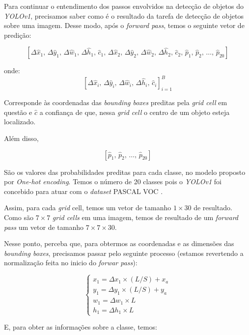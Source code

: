 Para continuar o entendimento dos passos envolvidos na detecção de objetos do \emph{YOLOv1}, precisamos saber como é o resultado da tarefa de detecção de objetos sobre uma imagem. Desse modo, após o \emph{forward pass}, temos o seguinte vetor de predição:

$$
\left[
\Delta\hat{x}_1, \, \Delta\hat{y}_1, \, \Delta \hat{w}_1, \, \Delta\hat{h}_1, \, \hat{c}_1, \, \Delta\hat{x}_2, \, \Delta\hat{y}_2, \, \Delta\hat{w}_2, \, \Delta \hat{h}_2, \, \hat{c}_2, \, \hat{p}_1, \, \hat{p}_2, \, \dots, \, \hat{p}_{20} 
\right]
$$

onde:
$$
\left[
\Delta\hat{x}_i, \, \Delta\hat{y}_i, \, \Delta \hat{w}_i, \, \Delta\hat{h}_i, \, \hat{c}_i
\right]^B_{i=1}
$$

Corresponde às coordenadas das \emph{bounding boxes} preditas pela \emph{grid cell} em questão e $\hat{c}$ a confiança de que, nessa \emph{grid cell} o centro de um objeto esteja localizado.

Além disso, 

$$
\left[
\hat{p}_1, \, \hat{p}_2, \, \dots, \, \hat{p}_{20} 
\right]
$$

São os valores das probabilidades preditas para cada classe, no modelo proposto por \emph{One-hot encoding}. Temos o número de 20 classes pois o \emph{YOLOv1} foi concebido para atuar com o \emph{dataset} PASCAL VOC \citep{yolo}.

Assim, para cada \emph{grid} cell, temos um vetor de tamanho $1 \times 30$ de resultado. Como são $7 \times 7$ \emph{grid cells} em uma imagem, temos de resultado de um \emph{forward pass} um vetor de tamanho $7 \times 7 \times 30$.

Nesse ponto, perceba que, para obtermos as coordenadas e as dimensões das \emph{bounding boxes}, precisamos passar pelo seguinte processo (estamos revertendo a normalização feita no inicio do \emph{forwar pass}):

$$
\begin{cases}
x_1 = \Delta x_1 \times \left(L / S \right) + x_a \\
y_1 = \Delta y_1 \times \left(L / S \right) + y_a \\
w_1 = \Delta w_1 \times L \\
h_1 = \Delta h_1 \times L
\end{cases}
$$

E, para obter as informações sobre a classe, temos:


